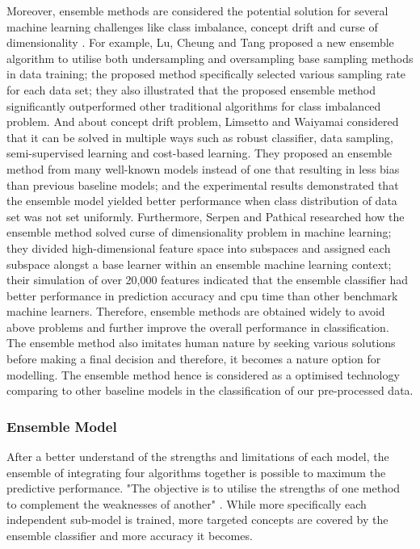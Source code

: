 \documentclass[12pt]{article}
\begin{document}
Moreover, ensemble methods are considered the potential solution for several machine learning challenges like class imbalance, concept drift and curse of dimensionality \cite{Sagi}. For example, Lu, Cheung and Tang \cite{Lu} proposed a new ensemble algorithm to utilise both undersampling and oversampling base sampling methods in data training; the proposed method specifically selected various sampling rate for each data set; they also illustrated that the proposed ensemble method significantly outperformed other traditional algorithms for class imbalanced problem. And about concept drift problem, Limsetto and Waiyamai \cite{Limsetto} considered that it can be solved in multiple ways such as robust classifier, data sampling, semi-supervised learning and cost-based learning. They proposed an ensemble method from many well-known models instead of one that resulting in less bias than previous baseline models; and the experimental results demonstrated that the ensemble model yielded better performance when class distribution of data set was not set uniformly. Furthermore, Serpen and Pathical \cite{Serpen} researched how the ensemble method solved curse of dimensionality problem in machine learning; they divided high-dimensional feature space into subspaces and assigned each subspace alongst a base learner within an ensemble machine learning context; their simulation of over 20,000 features indicated that the ensemble classifier had better performance in prediction accuracy and cpu time than other benchmark machine learners. Therefore, ensemble methods are obtained widely to avoid above problems and further improve the overall performance in classification.
\\

The ensemble method also imitates human nature by seeking various solutions before making a final decision \cite{Sagi} and therefore, it becomes a nature option for modelling. The ensemble method hence is considered as a optimised technology comparing to other baseline models in the classification of our pre-processed data.
\\

\subsubsection{Ensemble Model}
After a better understand of the strengths and limitations of each model, the ensemble of integrating four algorithms together is possible to maximum the predictive performance. "The objective is to utilise the strengths of one method to complement the weaknesses of another" \cite{Kotsiantis}. While more specifically each independent sub-model is trained, more targeted concepts are covered by the ensemble classifier and more accuracy it becomes. 
\\
\end{document}
